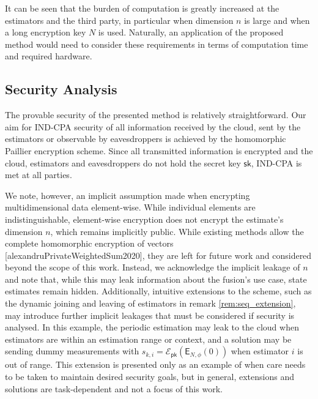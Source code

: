 It can be seen that the burden of computation is greatly increased at the estimators and the third party, in particular when dimension $n$ is large and when a long encryption key $N$ is used. Naturally, an application of the proposed method would need to consider these requirements in terms of computation time and required hardware.

% 
% 

\subsection{Security Analysis}\label{subsec:security}
The provable security of the presented method is relatively straightforward. Our aim for IND-CPA security of all information received by the cloud, sent by the estimators or observable by eavesdroppers is achieved by the homomorphic Paillier encryption scheme. Since all transmitted information is encrypted and the cloud, estimators and eavesdroppers do not hold the secret key $\mathsf{sk}$, IND-CPA is met at all parties.

We note, however, an implicit assumption made when encrypting multidimensional data element-wise. While individual elements are indistinguishable, element-wise encryption does not encrypt the estimate's dimension $n$, which remains implicitly public. While existing methods allow the complete homomorphic encryption of vectors [alexandruPrivateWeightedSum2020], they are left for future work and considered beyond the scope of this work. Instead, we acknowledge the implicit leakage of $n$ and note that, while this may leak information about the fusion's use case, state estimates remain hidden. Additionally, intuitive extensions to the scheme, such as the dynamic joining and leaving of estimators in remark \ref{rem:seq_extension}, may introduce further implicit leakages that must be considered if security is analysed. In this example, the periodic estimation may leak to the cloud when estimators are within an estimation range or context, and a solution may be sending dummy measurements with $s_{k,i}=\mathcal{E}_{\mathsf{pk}}(\mathsf{E}_{N,\phi}(0))$ when estimator $i$ is out of range. This extension is presented only as an example of when care needs to be taken to maintain desired security goals, but in general, extensions and solutions are task-dependent and not a focus of this work.


